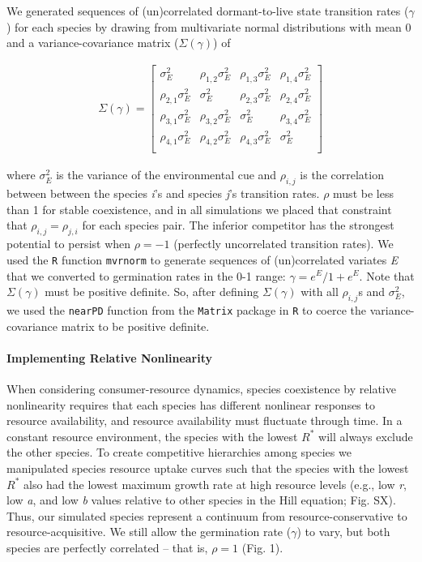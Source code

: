 \documentclass[12pt,]{article}
\begin{document}
We generated sequences of (un)correlated dormant-to-live state
transition rates (\(\gamma\)) for each species by drawing from
multivariate normal distributions with mean 0 and a variance-covariance
matrix (\(\Sigma(\gamma)\)) of

\begin{align}
\Sigma(\gamma) = 
\begin{bmatrix}
\sigma^2_{E} & \rho_{1,2}\sigma^2_{E} & \rho_{1,3}\sigma^2_{E} & \rho_{1,4}\sigma^2_{E} \\
\rho_{2,1}\sigma^2_{E} & \sigma^2_{E} & \rho_{2,3}\sigma^2_{E} & \rho_{2,4}\sigma^2_{E} \\
\rho_{3,1}\sigma^2_{E} & \rho_{3,2}\sigma^2_{E} & \sigma^2_{E}  & \rho_{3,4}\sigma^2_{E} \\
\rho_{4,1}\sigma^2_{E} & \rho_{4,2}\sigma^2_{E} & \rho_{4,3}\sigma^2_{E} & \sigma^2_{E}  \\
\end{bmatrix}
\end{align}

\noindent where \(\sigma^2_{E}\) is the variance of the environmental
cue and \(\rho_{i,j}\) is the correlation between between the species
\emph{i}'s and species \emph{j}'s transition rates. \(\rho\) must be
less than 1 for stable coexistence, and in all simulations we placed
that constraint that \(\rho_{i,j} = \rho_{j,i}\) for each species pair.
The inferior competitor has the strongest potential to persist when
\(\rho=-1\) (perfectly uncorrelated transition rates). We used the
\texttt{R} function \texttt{mvrnorm} to generate sequences of
(un)correlated variates \emph{E} that we converted to germination rates
in the 0-1 range: \(\gamma = e^E / 1 + e^E\). Note that
\(\Sigma(\gamma)\) must be positive definite. So, after defining
\(\Sigma(\gamma)\) with all \(\rho_{i,j}\)s and \(\sigma^2_{E}\), we
used the \texttt{nearPD} function from the \texttt{Matrix} package in
\texttt{R} to coerce the variance-covariance matrix to be positive
definite.

\paragraph{Implementing Relative
Nonlinearity}\label{implementing-relative-nonlinearity}

When considering consumer-resource dynamics, species coexistence by
relative nonlinearity requires that each species has different nonlinear
responses to resource availability, and resource availability must
fluctuate through time. In a constant resource environment, the species
with the lowest \(R^*\) will always exclude the other species. To create
competitive hierarchies among species we manipulated species resource
uptake curves such that the species with the lowest \(R^*\) also had the
lowest maximum growth rate at high resource levels (e.g., low \emph{r},
low \emph{a}, and low \emph{b} values relative to other species in the
Hill equation; Fig. SX). Thus, our simulated species represent a
continuum from resource-conservative to resource-acquisitive. We still
allow the germination rate (\(\gamma\)) to vary, but both species are
perfectly correlated -- that is, \(\rho=1\) (Fig. 1).
\end{document}
